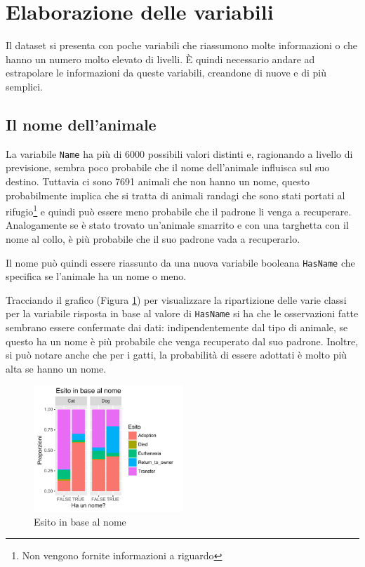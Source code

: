 
\section{Elaborazione delle variabili}

Il dataset si presenta con poche variabili che riassumono molte informazioni o che hanno un numero molto elevato di livelli. \`E quindi necessario andare ad estrapolare le informazioni da queste variabili, creandone di nuove e di più semplici.

\subsection{Il nome dell'animale}

La variabile \texttt{Name} ha più di 6000 possibili valori distinti e, ragionando a livello di previsione, sembra poco probabile che il nome dell'animale influisca sul suo destino. Tuttavia ci sono 7691 animali che non hanno un nome, questo probabilmente implica che si tratta di animali randagi che sono stati portati al rifugio\footnote{Non vengono fornite informazioni a riguardo} e quindi può essere meno probabile che il padrone li venga a recuperare. Analogamente se è stato trovato un'animale smarrito e con una targhetta con il nome al collo, è più probabile che il suo padrone vada a recuperarlo.

Il nome può quindi essere riassunto da una nuova variabile booleana \texttt{HasName} che specifica se l'animale ha un nome o meno.

Tracciando il grafico (Figura \ref{fig-has-name}) per visualizzare la ripartizione delle varie classi per la variabile risposta in base al valore di \texttt{HasName} si ha che le osservazioni fatte sembrano essere confermate dai dati: indipendentemente dal tipo di animale, se questo ha un nome è più probabile che venga recuperato dal suo padrone. Inoltre, si può notare anche che per i gatti, la probabilità di essere adottati è molto più alta se hanno un nome.

\begin{figure}[htbp]
	\centering
	\includegraphics[width=0.5\textwidth]{./grafici/esito_has_name.pdf}
	\caption{Esito in base al nome}\label{fig-has-name}
\end{figure}

